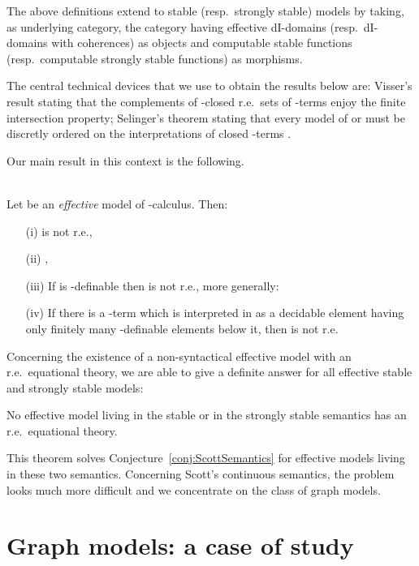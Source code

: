 \documentclass[english]{llncs}
\begin{document}
The above definitions extend to stable (resp.\ strongly stable) models by taking, as underlying category, the category having effective 
dI-domains (resp.\ dI-domains with coherences) as objects and computable stable functions (resp.\ computable strongly stable functions) as morphisms.

The central technical devices that we use to obtain the results below are:
 Visser's result \cite{Visser80} stating that the complements of -closed r.e.\ sets of -terms enjoy the finite intersection property; 
 Selinger's theorem stating that every model of  or  must be discretly ordered on the interpretations 
of closed -terms \cite{Selinger03}. 

Our main result in this context is the following.

\begin{theorem} \cite[Cor.~6.2.47, Cor.~6.2.49, Prop.~6.2.40, Thm.~6.2.44]{ManzonettoTh}\\
Let  be an \emph{effective} model of -calculus. Then:
\begin{itemize}
\item[(i)]  is not r.e.,
\item[(ii)] ,
\item[(iii)] If  is -definable then  is not r.e., more generally:
\item[(iv)] If there is a -term  which is interpreted in  as a decidable element having only finitely many 
-definable elements below it, then  is not r.e.
\end{itemize}
\end{theorem}

Concerning the existence of a non-syntactical effective model with an r.e.\ equational theory, we are able to give a definite answer for all effective stable and strongly stable models:

\begin{theorem} \cite[Thm.~6.3.2]{ManzonettoTh}
No effective model living in the stable or in the strongly stable semantics has an r.e.\ equational theory.
\end{theorem}

This theorem solves Conjecture~\ref{conj:ScottSemantics} for effective models living in these two semantics. 
Concerning Scott's continuous semantics, the problem looks much more difficult and we concentrate on the class of graph models.

\section{Graph models: a case of study}\label{sec:Graph models: a case of study}
\end{document}
